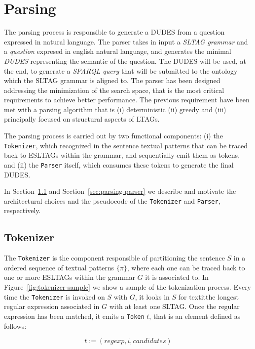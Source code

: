 \section{Parsing}
\label{sec:parsing}

The parsing process is responsible to generate a DUDES from a question expressed in natural language. 
%
The parser takes in input a \textit{SLTAG grammar} and a \textit{question} expresed in english natural language, and generates the minimal \textit{DUDES} representing the semantic of the question.
%
The DUDES will be used, at the end, to generate a \textit{SPARQL query} that will be submitted to the ontology which the SLTAG grammar is aligned to.
%
The parser has been designed addressing the minimization of the search space, that is the most critical requirements to achieve better performance.
%
The previous requirement have been met with a parsing algorithm that is (i) deterministic (ii) greedy and (iii) principally focused on structural aspects of LTAGs.

The parsing process is carried out by two functional components: 
(i) the \texttt{Tokenizer}, which recognized in the sentence textual patterns that can be traced back to ESLTAGs within the grammar, and sequentially emit them as tokens, and 
(ii) the \texttt{Parser} itself, which consumes these tokens to generate the final DUDES.

In Section~\ref{sec:parsing-tokenizer} and Section~\ref{sec:parsing-parser} we describe and motivate the architectural choices and the pseudocode of the \texttt{Tokenizer} and \texttt{Parser}, respectively.


\subsection{Tokenizer}
\label{sec:parsing-tokenizer}
The \texttt{Tokenizer} is the component responsible of partitioning the sentence $S$ in a ordered sequence of textual patterns $\{\pi\}$, where each one can be traced back to one or more ESLTAGs within the grammar $G$ it is associated to. 
%
In Figure~\ref{fig:tokenizer-sample} we show a sample of the tokenization process.
%
Every time the \texttt{Tokenizer} is invoked on $S$ with $G$, it looks in $S$ for textit{the longest regular expression associated in $G$ with at least one SLTAG}. Once the regular expression has been matched, it emits a \texttt{Token} $t$, that is an element defined as follows:

\begin{equation}
\label{eqn:token}
t:=(regexp,i,candidates)
\end{equation}

